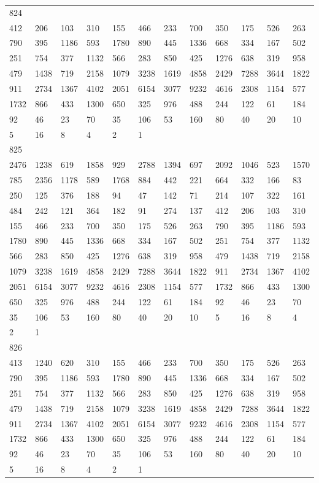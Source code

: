\begin{longtable}{llllllllllll}
824&&&&&&&&&&&\\
412& 206& 103& 310& 155& 466& 233& 700& 350& 175& 526& 263\\
790& 395& 1186& 593& 1780& 890& 445& 1336& 668& 334& 167& 502\\
251& 754& 377& 1132& 566& 283& 850& 425& 1276& 638& 319& 958\\
479& 1438& 719& 2158& 1079& 3238& 1619& 4858& 2429& 7288& 3644& 1822\\
911& 2734& 1367& 4102& 2051& 6154& 3077& 9232& 4616& 2308& 1154& 577\\
1732& 866& 433& 1300& 650& 325& 976& 488& 244& 122& 61& 184\\
92& 46& 23& 70& 35& 106& 53& 160& 80& 40& 20& 10\\
5& 16& 8& 4& 2& 1& \\

825&&&&&&&&&&&\\
2476& 1238& 619& 1858& 929& 2788& 1394& 697& 2092& 1046& 523& 1570\\
785& 2356& 1178& 589& 1768& 884& 442& 221& 664& 332& 166& 83\\
250& 125& 376& 188& 94& 47& 142& 71& 214& 107& 322& 161\\
484& 242& 121& 364& 182& 91& 274& 137& 412& 206& 103& 310\\
155& 466& 233& 700& 350& 175& 526& 263& 790& 395& 1186& 593\\
1780& 890& 445& 1336& 668& 334& 167& 502& 251& 754& 377& 1132\\
566& 283& 850& 425& 1276& 638& 319& 958& 479& 1438& 719& 2158\\
1079& 3238& 1619& 4858& 2429& 7288& 3644& 1822& 911& 2734& 1367& 4102\\
2051& 6154& 3077& 9232& 4616& 2308& 1154& 577& 1732& 866& 433& 1300\\
650& 325& 976& 488& 244& 122& 61& 184& 92& 46& 23& 70\\
35& 106& 53& 160& 80& 40& 20& 10& 5& 16& 8& 4\\
2& 1& \\

826&&&&&&&&&&&\\
413& 1240& 620& 310& 155& 466& 233& 700& 350& 175& 526& 263\\
790& 395& 1186& 593& 1780& 890& 445& 1336& 668& 334& 167& 502\\
251& 754& 377& 1132& 566& 283& 850& 425& 1276& 638& 319& 958\\
479& 1438& 719& 2158& 1079& 3238& 1619& 4858& 2429& 7288& 3644& 1822\\
911& 2734& 1367& 4102& 2051& 6154& 3077& 9232& 4616& 2308& 1154& 577\\
1732& 866& 433& 1300& 650& 325& 976& 488& 244& 122& 61& 184\\
92& 46& 23& 70& 35& 106& 53& 160& 80& 40& 20& 10\\
5& 16& 8& 4& 2& 1& \\


\end{longtable}
